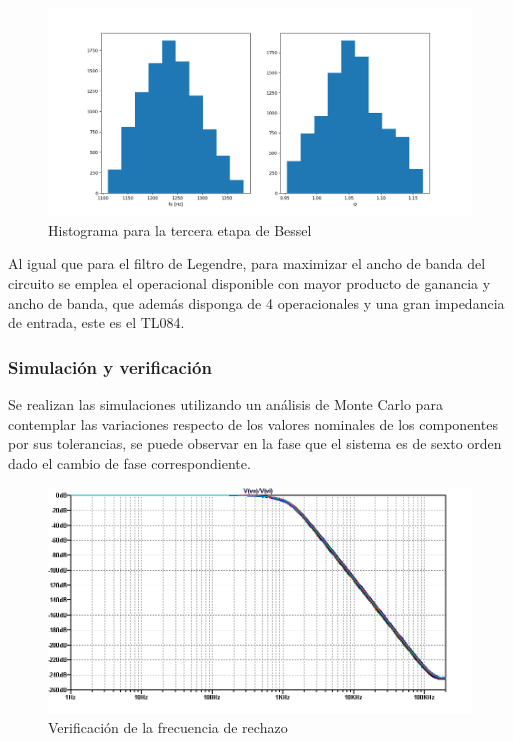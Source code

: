 \begin{figure}[H]
    \centering
    \includegraphics[scale=0.4]{../EJ1/Recursos/bessel_histogram_three.png}
    \caption{Histograma para la tercera etapa de Bessel}
    \label{fig:bessel_histogram_three}
\end{figure}

Al igual que para el filtro de Legendre, para maximizar el ancho de banda del circuito se emplea el operacional disponible con mayor producto de ganancia y ancho de banda, que adem\'as disponga de 4 operacionales y una gran impedancia de entrada, este es el TL084.

\subsubsection{Simulaci\'on y verificaci\'on}
Se realizan las simulaciones utilizando un an\'alisis de Monte Carlo para contemplar las variaciones respecto de los valores nominales de los componentes por sus tolerancias,
se puede observar en la fase que el sistema es de sexto orden dado el cambio de fase correspondiente.

\begin{figure}[H]
    \centering
    \includegraphics[scale=0.6]{../EJ1/Recursos/bessel_verificacion_magnitud.png}
    \caption{Verificaci\'on de la frecuencia de rechazo}
\end{figure}


